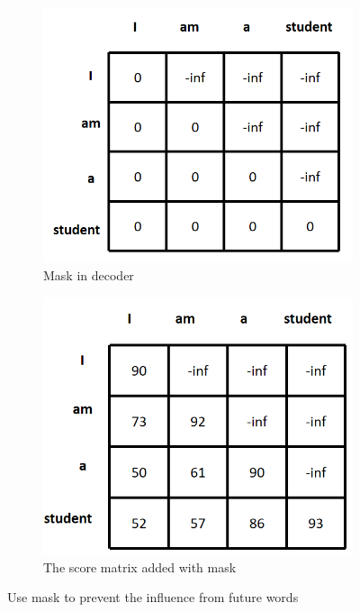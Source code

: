   \begin{figure}[htbp]
		\centering
		\begin{subfigure}[b]{0.5\textwidth}
			\centering
			\includegraphics[width=0.9\linewidth]{example_images/mask}
			\caption{Mask in decoder}
			\label{Mask in decoder}
		\end{subfigure}
		\hfill
		\begin{subfigure}[b]{0.5\textwidth}
			\centering
			\includegraphics[width=0.9\linewidth]{example_images/mask1}
			\caption{The score matrix added with mask}
			\label{The score matrix added with mask}
		\end{subfigure}
		\caption{Use mask to prevent the influence from future words}
		\label{Use mask to prevent the influence from future words}
	\end{figure}
